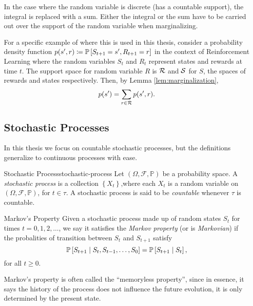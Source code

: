 In the case where the random variable is discrete (has a countable support), the
integral is replaced with a sum. Either the integral or the sum have to be
carried out over the support of the random variable when marginalizing.

For a specific example of where this is used in this thesis, consider a
probability density function $p(s', r) \coloneqq \mathbb{P}\left[S_{t+1} = s', R_{t+1} = r\right]$
in the context of Reinforcement Learning where the random variables $S_t$ and
$R_t$ represent states and rewards at time $t$. The support space for random
variable $R$ is $\mathcal{R}$ and $\mathcal{S}$ for $S$, the spaces of rewards and
states respectively. Then, by Lemma
\ref{lem:marginalization},
\[
    p(s') = \sum_{r \in \mathcal{R}} p(s', r).
\] 

\subsection{Stochastic Processes}

In this thesis we focus on countable stochastic processes, but the definitions
generalize to continuous processes with ease.

\begin{dfn}{Stochastic Process}{stochastic-process}
    Let $(\Omega, \mathcal{F}, \mathbb{P})$ be a probability space. A
    \emph{stochastic process} is a collection $\left\{ X_t \right\}$,where each
    $X_t$ is a random variable on $(\Omega, \mathcal{F}, \mathbb{P})$, for $t
    \in \tau$. A stochastic process is said to be \emph{countable} whenever
    $\tau$ is countable.
\end{dfn}

\begin{dfn}{Markov's Property}{}
    Given a stochastic process made up of random states $S_t$ for times $t = 0,
    1, 2, \dots$, we say it satisfies the \emph{Markov property} (or is
    \emph{Markovian}) if the probalities of transition between $S_t$ and
    $S_{t+1}$ satisfy
    \[
        \mathbb{P}\left[S_{t+1} \mid S_t, S_{t-1}, \dots, S_0 \right] = \mathbb{P}\left[S_{t+1} \mid S_t\right],
    \]
    for all $t \geq 0$.
\end{dfn}

Markov's property is often called the ``memoryless property'', since in essence,
it says the history of the process does not influence the future evolution, it
is only determined by the present state.

